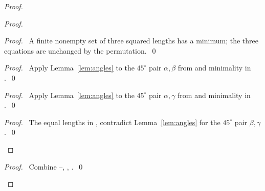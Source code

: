 \begin{proof}
\begin{proof}
\begin{proof}\pf\ A finite nonempty set of three squared lengths
has a minimum; the three equations are unchanged by the permutation.~\qed\end{proof}
\begin{proof}\pf\ Apply Lemma~\ref{lem:angles} to the $45^\circ$ pair
$\alpha,\beta$ from  and minimality in
.~\qed\end{proof}
\begin{proof}\pf\ Apply Lemma~\ref{lem:angles} to the $45^\circ$ pair
$\alpha,\gamma$ from  and minimality in
.~\qed\end{proof}
\qedstep
\begin{proof}\pf\ The equal lengths in ,
 contradict Lemma~\ref{lem:angles} for the
$45^\circ$ pair $\beta,\gamma$.~\qed\end{proof}
\end{proof}
\qedstep
\begin{proof}\pf\ Combine --,
, .~\qed\end{proof}
\end{proof}

